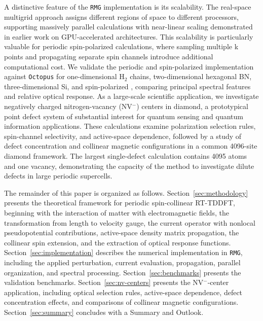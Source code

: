 A distinctive feature of the \texttt{RMG} implementation is its
scalability. The real-space multigrid approach assigns different
regions of space to different processors, supporting massively
parallel calculations with near-linear scaling demonstrated in
earlier work on GPU-accelerated
architectures.\cite{jakowski-rmg-tddft-2025,rmg-dft-2024}
This scalability is particularly valuable for periodic
spin-polarized calculations, where sampling multiple k points
and propagating separate spin channels introduce additional
computational cost.
We validate the periodic and spin-polarized implementation	
against \texttt{Octopus} for
one-dimensional H$_2$ chains, two-dimensional hexagonal BN,
three-dimensional Si,
and spin-polarized , comparing
principal spectral features and relative optical response.
As a large-scale scientific application, we investigate negatively
charged nitrogen-vacancy (NV$^-$) centers in diamond,
a prototypical point defect system of
substantial interest for quantum sensing and quantum information
applications.\cite{NV-Doherty-2013} 
These calculations examine polarization selection rules,
spin-channel selectivity, and active-space dependence, followed
by a study of defect concentration and collinear magnetic
configurations in a common 4096-site diamond framework.
The largest single-defect calculation contains 4095 atoms and
one vacancy, demonstrating the capacity of the method to
investigate dilute defects in large periodic supercells.


The remainder of this paper is organized as follows.
Section~\ref{sec:methodology} presents the theoretical framework for
periodic spin-collinear RT-TDDFT, beginning with the interaction
of matter with electromagnetic fields,  the transformation
from length to velocity gauge, the current operator with nonlocal
pseudopotential contributions, active-space  density matrix propagation,
the collinear spin extension, and
the extraction of optical response functions. 
Section~\ref{sec:implementation}
describes the numerical implementation in
\texttt{RMG}, including the applied perturbation, current
evaluation, propagation, parallel organization, and spectral
processing.
Section~\ref{sec:benchmarks} presents the validation benchmarks.
Section~\ref{sec:nv-centers} presents the NV$^-$-center application, including
optical selection rules, active-space dependence, defect
concentration effects, and comparisons of collinear magnetic
configurations.
Section~\ref{sec:summary} concludes with a Summary and Outlook.


